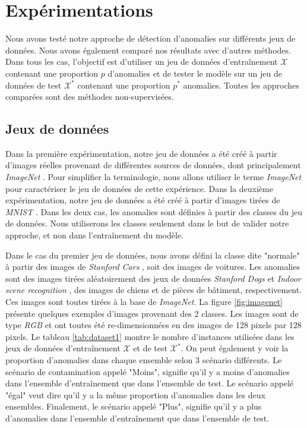 \chapter{Expérimentations}     %
\label{chap:experiments}                   %

Nous avons testé notre approche de détection d'anomalies sur différents jeux de données. Nous avons également comparé nos résultats avec d'autres méthodes. Dans tous les cas, l'objectif est d'utiliser un jeu de données d'entraînement $\mathcal{X}$ contenant une proportion $p$ d'anomalies et de tester le modèle sur un jeu de données de test $\mathcal{X^*}$ contenant une proportion $p^*$ anomalies. Toutes les approches comparées sont des méthodes non-supervisées.

\section{Jeux de données} \label{exp:datasets}

Dans la première expérimentation, notre jeu de données a été créé à partir d'images réelles provenant de différentes sources de données, dont principalement \textit{ImageNet} \citep{deng2009imagenet}. Pour simplifier la terminologie, nous allons utiliser le terme \textit{ImageNet} pour caractériser le jeu de données de cette expérience. Dans la deuxième expérimentation, notre jeu de données a été créé à partir d'images tirées de \textit{MNIST} \citep{lecun2010mnist}. Dans les deux cas, les anomalies sont définies à partir des classes du jeu de données. Nous utiliserons les classes seulement dans le but de valider notre approche, et non dans l'entraînement du modèle.

Dans le cas du premier jeu de données, nous avons défini la classe dite "normale" à partir des images de \textit{Stanford Cars} \citep{KrauseStarkDengFei-Fei_3DRR2013}, soit des images de voitures. Les anomalies sont des images tirées aléatoirement des jeux de données \textit{Stanford Dogs} \citep{KhoslaYaoJayadevaprakashFeiFei_FGVC2011} et \textit{Indoor scene recognition} \citep{5206537}, des images de chiens et de pièces de bâtiment, respectivement. Ces images sont toutes tirées à la base de \textit{ImageNet}. La figure \ref{fig:imagenet} présente quelques exemples d'images provenant des 2 classes. Les images sont de type \textit{RGB} et ont toutes été re-dimensionnées en des images de 128 pixels par 128 pixels. Le tableau \ref{tab:dataset1} montre le nombre d'instances utilisées dans les jeux de données d'entraînement $\mathcal{X}$ et de test $\mathcal{X^*}$. On peut également y voir la proportion d'anomalies dans chaque ensemble selon 3 scénario différents. Le scénario de contamination appelé "Moins", signifie qu'il y a moins d'anomalies dans l'ensemble d'entraînement que dans l'ensemble de test. Le scénario appelé "égal" veut dire qu'il y a la même proportion d'anomalies dans les deux ensembles. Finalement, le scénario appelé "Plus", signifie qu'il y a plus d'anomalies dans l'ensemble d'entraînement que dans l'ensemble de test.

